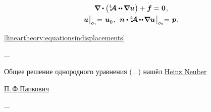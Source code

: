 \nopagebreak\vspace{-0.1em}\begin{equation}\label{lineartheory:equationsindisplacements}
\begin{array}{c}
\boldnabla \dotp \left( \stiffnesstensor \dotdotp \hspace{-0.12ex} \boldnabla \bm{u} \hspace{.1ex} \right) + \hspace{.1ex} \bm{f} = \hspace{.1ex} \bm{0}
\hspace{.16ex} , \\[.4em]
%
\bm{u} \hspace{.1ex} \bigr|_{o_1} \hspace{-0.64ex} = \hspace{.2ex} \bm{u}_{\raisemath{-0.1em}{0}}
\hspace{.16ex} , \:\:
\unitnormalvector \dotp %
\stiffnesstensor \hspace{-0.08ex} \dotdotp \hspace{-0.24ex} \boldnabla \bm{u}
\hspace{.25ex} \bigr|_{o_2} \hspace{-0.64ex} = \hspace{.2ex} \bm{p}
\hspace{.16ex} .
\end{array}
\end{equation}%


 \eqref{lineartheory:equationsindisplacements} 

...

\begin{otherlanguage}{russian}

Общее решение однородного уравнения (...) нашёл \href{https://de.wikipedia.org/wiki/Heinz_Neuber}{Heinz Neuber}

\href{https://ru.wikipedia.org/wiki/%D0%9F%D0%B0%D0%BF%D0%BA%D0%BE%D0%B2%D0%B8%D1%87,_%D0%9F%D1%91%D1%82%D1%80_%D0%A4%D1%91%D0%B4%D0%BE%D1%80%D0%BE%D0%B2%D0%B8%D1%87}{П.\,Ф.\:Папкович}

...

\end{otherlanguage}

